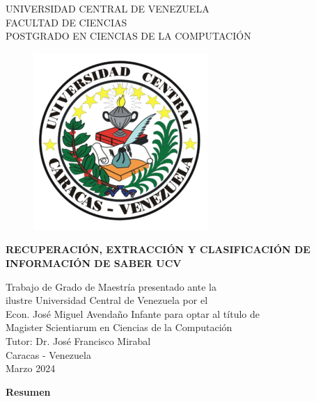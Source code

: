 \thispagestyle{empty}
\begin{center}
	UNIVERSIDAD CENTRAL DE VENEZUELA\\
	FACULTAD DE CIENCIAS\\
	POSTGRADO EN CIENCIAS DE LA COMPUTACI\'ON\\

	\begin{figure}
						\centering
						  \includegraphics[height=.7\textwidth]{images/UCV.png}
  \end{figure}
  \vspace{1.5cm}
  \large{\textbf{RECUPERACI\'ON, EXTRACCI\'ON Y CLASIFICACI\'ON DE \\ INFORMACI\'ON DE SABER UCV}}

  \vspace{3cm}
  Trabajo de Grado de Maestría presentado ante la \\
  ilustre Universidad Central de Venezuela por el\\
  Econ. José Miguel Avendaño Infante para  optar
  al título de \\Magister Scientiarum en Ciencias de la Computaci\'on\\
  \vspace{0.5cm}
  Tutor: Dr. José Francisco Mirabal\\
  \vspace{1.5cm}
  Caracas - Venezuela\\
  Marzo 2024
\end{center}


\newpage
\thispagestyle{empty}
\large{\textbf{Resumen}}

